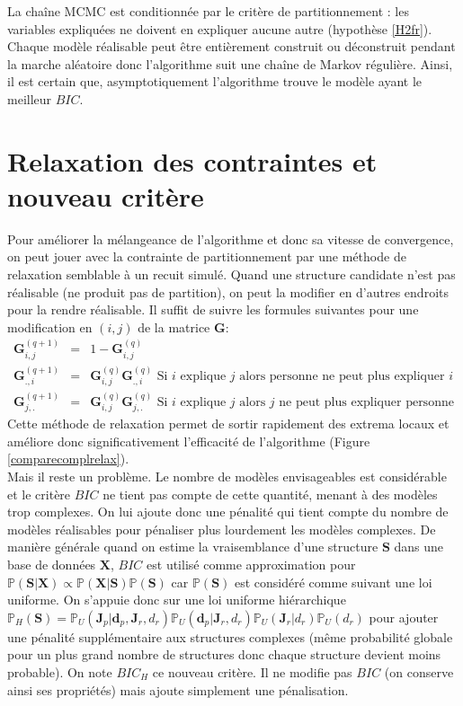 \documentclass[12pt,a4paper]{report}
\begin{document}
		La chaîne MCMC est conditionnée par le critère de partitionnement : les variables expliquées ne doivent en expliquer aucune autre (hypothèse \ref{H2fr}). Chaque modèle réalisable peut être entièrement construit ou déconstruit pendant la marche aléatoire donc l'algorithme suit une chaîne de Markov régulière. Ainsi, il est certain que, asymptotiquement l'algorithme trouve le modèle ayant le meilleur $BIC$.
	\section{Relaxation des contraintes et nouveau critère}
		Pour améliorer la mélangeance de l'algorithme et donc sa vitesse de convergence, on peut jouer avec la contrainte de partitionnement par une méthode de relaxation semblable à un recuit simulé. Quand une structure candidate n'est pas réalisable (ne produit pas de partition), on peut la modifier en d'autres endroits pour la rendre réalisable. Il suffit de suivre les formules suivantes pour une modification en $(i,j)$ de la  matrice $\boldsymbol{G}$:
		\begin{eqnarray}
			\boldsymbol{G}_{i,j}^{(q+1)}&=&1-\boldsymbol{G}_{i,j}^{(q)} \\
			\boldsymbol{G}_{.,i}^{(q+1)}&=& \boldsymbol{G}_{i,j}^{(q)}\boldsymbol{G}_{.,i}^{(q)} \textrm{ Si $i$ explique $j$ alors personne ne peut plus expliquer $i$} \\
			\boldsymbol{G}_{j,.}^{(q+1)}&=&\boldsymbol{G}_{i,j}^{(q)}\boldsymbol{G}_{j,.}^{(q)} \textrm{ Si $i$ explique $j$ alors $j$ ne peut plus expliquer personne}
		\end{eqnarray}
		Cette méthode de relaxation permet de sortir rapidement des extrema locaux et améliore donc significativement l'efficacité de l'algorithme (Figure \ref{comparecomplrelax}).\\
		 
		Mais il reste un problème. Le nombre de modèles envisageables est considérable et le critère $BIC$ ne tient pas compte de cette quantité, menant à des modèles trop complexes. On lui ajoute donc une pénalité qui tient compte du nombre de modèles réalisables pour pénaliser plus lourdement les modèles complexes.
	De manière générale quand on estime la vraisemblance d'une structure $\boldsymbol{S}$ dans une base de données $\boldsymbol{X}$, $BIC$ est utilisé comme approximation pour $\mathbb{P}(\boldsymbol{S}|\boldsymbol{X})\propto  \mathbb{P}(\boldsymbol{X}|\boldsymbol{S})\mathbb{P}(\boldsymbol{S})$  	car $\mathbb{P}(\boldsymbol{S})$ est considéré comme suivant une loi uniforme. On s'appuie donc sur une loi uniforme hiérarchique $\mathbb{P}_{H}(\boldsymbol{S})=\mathbb{P}_{U}(\boldsymbol{J}_p | \boldsymbol{d}_p,\boldsymbol{J}_r,d_r)\mathbb{P}_{U}(\boldsymbol{d}_p|\boldsymbol{J}_r,d_r)\mathbb{P}_{U}(\boldsymbol{J}_r|d_r)\mathbb{P}_{U}(d_r)$ pour ajouter une pénalité supplémentaire aux structures complexes (même probabilité globale pour un plus grand nombre de structures donc chaque structure devient moins probable). 
On note $BIC_H$ ce nouveau critère. Il ne modifie pas $BIC$ (on conserve ainsi ses propriétés) mais ajoute simplement une pénalisation.\\
\end{document}
